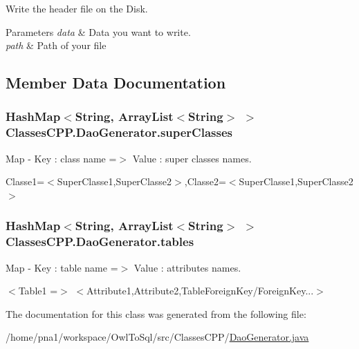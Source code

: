 Write the header file on the Disk. 


\begin{DoxyParams}{Parameters}
{\em data} & Data you want to write. \\
\hline
{\em path} & Path of your file \\
\hline
\end{DoxyParams}


\subsection{Member Data Documentation}
\hypertarget{class_classes_c_p_p_1_1_dao_generator_a82c17c8ceb0920fdb5550acd119418e3}{
\subsubsection[{superClasses}]{\setlength{\rightskip}{0pt plus 5cm}HashMap$<$String, ArrayList$<$String$>$ $>$ {\bf ClassesCPP.DaoGenerator.superClasses}}}
\label{class_classes_c_p_p_1_1_dao_generator_a82c17c8ceb0920fdb5550acd119418e3}


Map -\/ Key : class name =$>$ Value : super classes names. 

Classe1=$<$SuperClasse1,SuperClasse2$>$,Classe2=$<$SuperClasse1,SuperClasse2$>$ \hypertarget{class_classes_c_p_p_1_1_dao_generator_aac7347b462abcc6c13537cb2742db47a}{
\subsubsection[{tables}]{\setlength{\rightskip}{0pt plus 5cm}HashMap$<$String, ArrayList$<$String$>$ $>$ {\bf ClassesCPP.DaoGenerator.tables}}}
\label{class_classes_c_p_p_1_1_dao_generator_aac7347b462abcc6c13537cb2742db47a}


Map -\/ Key : table name =$>$ Value : attributes names. 

$<$Table1 =$>$ $<$Attribute1,Attribute2,TableForeignKey/ForeignKey...$>$ 

The documentation for this class was generated from the following file:\begin{DoxyCompactItemize}
\item 
/home/pna1/workspace/OwlToSql/src/ClassesCPP/\hyperlink{_dao_generator_8java}{DaoGenerator.java}\end{DoxyCompactItemize}
